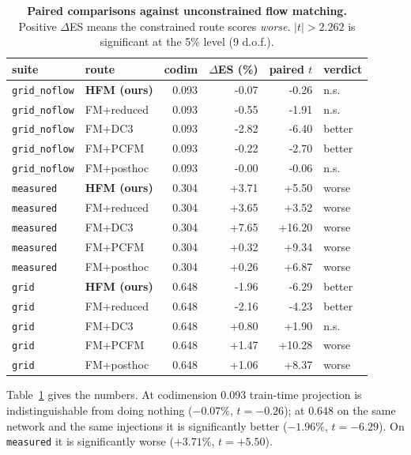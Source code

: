 \documentclass{article}
\newcommand{\dataset}[1]{\texttt{#1}}
\begin{document}
\begin{table}[t]\centering\small
\caption{\textbf{Paired comparisons against unconstrained flow matching.} Positive $\Delta$ES means the constrained route scores \emph{worse}. $|t|>2.262$ is significant at the 5\% level (9 d.o.f.).}\label{tab:paired}
\begin{tabular}{llrrrl}\toprule
suite & route & codim & $\Delta$ES (\%) & paired $t$ & verdict\\\midrule
\dataset{grid\_noflow} & \textbf{HFM (ours)} & 0.093 & -0.07 & -0.26 & n.s.\\
\dataset{grid\_noflow} & FM+reduced & 0.093 & -0.55 & -1.91 & n.s.\\
\dataset{grid\_noflow} & FM+DC3 & 0.093 & -2.82 & -6.40 & \textcolor{energygreen}{better}\\
\dataset{grid\_noflow} & FM+PCFM & 0.093 & -0.22 & -2.70 & \textcolor{energygreen}{better}\\
\dataset{grid\_noflow} & FM+posthoc & 0.093 & -0.00 & -0.06 & n.s.\\
\midrule
\dataset{measured} & \textbf{HFM (ours)} & 0.304 & +3.71 & +5.50 & \textcolor{warnred}{worse}\\
\dataset{measured} & FM+reduced & 0.304 & +3.65 & +3.52 & \textcolor{warnred}{worse}\\
\dataset{measured} & FM+DC3 & 0.304 & +7.65 & +16.20 & \textcolor{warnred}{worse}\\
\dataset{measured} & FM+PCFM & 0.304 & +0.32 & +9.34 & \textcolor{warnred}{worse}\\
\dataset{measured} & FM+posthoc & 0.304 & +0.26 & +6.87 & \textcolor{warnred}{worse}\\
\midrule
\dataset{grid} & \textbf{HFM (ours)} & 0.648 & -1.96 & -6.29 & \textcolor{energygreen}{better}\\
\dataset{grid} & FM+reduced & 0.648 & -2.16 & -4.23 & \textcolor{energygreen}{better}\\
\dataset{grid} & FM+DC3 & 0.648 & +0.80 & +1.90 & n.s.\\
\dataset{grid} & FM+PCFM & 0.648 & +1.47 & +10.28 & \textcolor{warnred}{worse}\\
\dataset{grid} & FM+posthoc & 0.648 & +1.06 & +8.37 & \textcolor{warnred}{worse}\\
\midrule
\bottomrule\end{tabular}\end{table}

Table~\ref{tab:paired} gives the numbers. At codimension 0.093 train-time projection is indistinguishable from doing nothing ($-0.07\%$, $t=-0.26$); at 0.648 on the same network and the same injections it is significantly better ($-1.96\%$, $t=-6.29$). On \dataset{measured} it is significantly worse ($+3.71\%$, $t=+5.50$).
\end{document}
